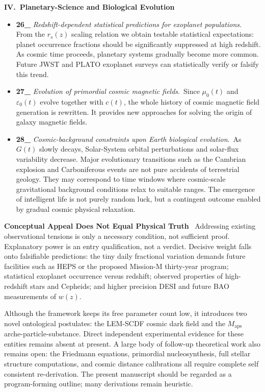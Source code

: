 \documentclass[12pt,leqno]{article}
\begin{document}
{		
	\medskip
	\bigskip
	\textbf{IV.\ Planetary-Science and Biological Evolution}
	\begin{itemize}
		\item \textbf{26\_} \textit{Redshift-dependent statistical predictions for exoplanet populations}.\,\,\,From the $r_s(z)$ scaling relation we obtain testable statistical expectations: planet occurrence fractions should be significantly suppressed at high redshift. As cosmic time proceeds, planetary systems gradually become more common. Future JWST and PLATO exoplanet surveys can statistically verify or falsify this trend.
		
		\item \textbf{27\_} \textit{Evolution of primordial cosmic magnetic fields}.\,\,\,Since $\mu_0(t)$ and $\varepsilon_0(t)$ evolve together with $c(t)$, the whole history of cosmic magnetic field generation is rewritten. It provides new approaches for solving the origin of galaxy magnetic fields.
		
		\item \textbf{28\_} \textit{Cosmic-background constraints upon Earth biological evolution}.\,\,\,As $G(t)$ slowly decays, Solar-System orbital perturbations and solar-flux variability decrease. Major evolutionary transitions such as the Cambrian explosion and Carboniferous events are not pure accidents of terrestrial geology. They may correspond to time windows where cosmic-scale gravitational background conditions relax to suitable ranges. The emergence of intelligent life is not purely random luck, but a contingent outcome enabled by gradual cosmic physical relaxation.
	\end{itemize}
	
	
	\bigskip
	\textbf{Conceptual Appeal Does Not Equal Physical Truth}\,\,\,
	Addressing existing observational tensions is only a necessary condition, not sufficient proof. Explanatory power is an entry qualification, not a verdict. Decisive weight falls onto falsifiable predictions: the tiny daily fractional variation demands future facilities such as HEPS or the proposed Mission-M thirty-year program; statistical exoplanet occurrence versus redshift; observed properties of high-redshift stars and Cepheids; and higher precision DESI and future BAO measurements of $w(z)$.
	
	\medskip
	Although the framework keeps its free parameter count low, it introduces two novel ontological postulates: the LEM-SCDF cosmic dark field and the $M_\mathrm{aps}$ arche-particle-substance. Direct independent experimental evidence for these entities remains absent at present. A large body of follow-up theoretical work also remains open: the Friedmann equations, primordial nucleosynthesis, full stellar structure computations, and cosmic distance calibrations all require complete self consistent re-derivation. The present manuscript should be regarded as a program-forming outline; many derivations remain heuristic.
		
}
\end{document}
